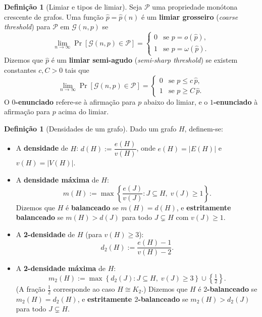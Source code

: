 \documentclass[reqno, 12pt]{amsart}
\numberwithin{equation}{section}
\theoremstyle{plain}
\theoremstyle{definition}
\newtheorem{definition}[theorem]{Definição}
\newcommand{\Gnp}{\mathcal{G}(n,p)}
\newcommand{\mdens}{m_2}
\newcommand{\maxdens}{m}
\begin{document}
\begin{definition}[Limiar e tipos de limiar]
Seja $\mathcal{P}$ uma propriedade monótona crescente de grafos.
Uma função $\hat{p} = \hat{p}(n)$ é um \textbf{limiar grosseiro} (\emph{coarse threshold})
para $\mathcal{P}$ em $\Gnp$ se
\[
  \lim_{n\to\infty} \Pr[\Gnp \in \mathcal{P}] =
  \begin{cases}
    0 & \text{se } p = o(\hat{p}),\\
    1 & \text{se } p = \omega(\hat{p}).
  \end{cases}
\]
Dizemos que $\hat{p}$ é um \textbf{limiar semi-agudo} (\emph{semi-sharp threshold})
se existem constantes $c, C > 0$ tais que
\[
  \lim_{n\to\infty} \Pr[\Gnp \in \mathcal{P}] =
  \begin{cases}
    0 & \text{se } p \le c\,\hat{p},\\
    1 & \text{se } p \ge C\,\hat{p}.
  \end{cases}
\]
O \textbf{$0$-enunciado} refere-se à afirmação para $p$ abaixo do limiar,
e o \textbf{$1$-enunciado} à afirmação para $p$ acima do limiar.
\end{definition}

\begin{definition}[Densidades de um grafo]
\label{def:densidades}
Dado um grafo $H$, definem-se:
\begin{itemize}
  \item A \textbf{densidade} de $H$:
    $d(H) := \dfrac{e(H)}{v(H)}$, onde $e(H) = |E(H)|$ e $v(H) = |V(H)|$.

  \item A \textbf{densidade máxima} de $H$:
    \[
      \maxdens(H) := \max\!\left\{\frac{e(J)}{v(J)} : J \subseteq H,\; v(J) \ge 1\right\}.
    \]
    Dizemos que $H$ é \textbf{balanceado} se $\maxdens(H) = d(H)$, e
    \textbf{estritamente balanceado} se $\maxdens(H) > d(J)$ para todo
    $J \subsetneq H$ com $v(J) \ge 1$.

  \item A \textbf{2-densidade} de $H$ (para $v(H) \ge 3$):
    \[
      d_2(H) := \frac{e(H)-1}{v(H)-2}.
    \]

  \item A \textbf{2-densidade máxima} de $H$:
    \[
      \mdens(H) := \max\!\left\{d_2(J) : J \subseteq H,\; v(J) \ge 3\right\}
        \cup \left\{\tfrac{1}{2}\right\}.
    \]
    (A fração $\frac{1}{2}$ corresponde ao caso $H \cong K_2$.)
    Dizemos que $H$ é \textbf{$2$-balanceado} se $\mdens(H) = d_2(H)$, e
    \textbf{estritamente $2$-balanceado} se $\mdens(H) > d_2(J)$ para todo
    $J \subsetneq H$.
\end{itemize}
\end{definition}
\end{document}
